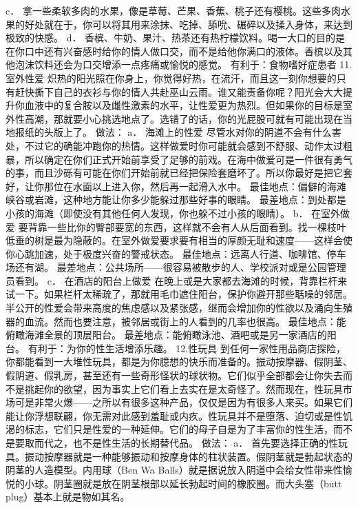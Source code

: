 \documentclass[12pt,UTF8,openany]{ctexbook}
\begin{document}
c． 拿一些柔软多肉的水果，像是草莓、芒果、香蕉、桃子还有樱桃。这些多肉水果的好处就在于，你可以将其用来涂抹、吃掉、舔吮、碾碎以及揉入身体，来达到极致的快感。
d． 香槟、牛奶、果汁、热茶还有热柠檬饮料。喝一大口的目的是在你口中还有兴奋感时给你的情人做口交，而不是给他你满口的液体。香槟以及其他泡沫饮料还会为口交增添一点疼痛或愉悦的感觉。
有利于：食物嗜好症患者
11.室外性爱
炽热的阳光照在你身上，你觉得好热，在流汗，而且这一刻你想要的只有赶快撕下自己的衣衫与你的情人共赴巫山云雨。谁又能责备你呢？阳光会大大提升你血液中的复合胺以及雌性激素的水平，让性爱更为热烈。但如果你的目标是室外性高潮，那就要小心挑选地点了。选错了的话，你的光屁股可就有可能出现在当地报纸的头版上了。
做法：
a． 海滩上的性爱
尽管水对你的阴道不会有什么害处，不过它的确能冲跑你的热情。这样做爱时你可能就会感到不舒服、动作太过粗暴，所以确定在你们正式开始前享受了足够的前戏。在海中做爱可是一件很有勇气的事，而且沙砾有可能在你们开始前就已经把保险套磨坏了。所以你最好是把它套好，让你那位在水面以上进入你，然后再一起滑入水中。
最佳地点：偏僻的海滩峡谷或岩滩，这种地方能让你多少能躲过那些好事的眼睛。
最差地点：到处都是小孩的海滩（即使没有其他任何人发现，你也躲不过小孩的眼睛）。
b． 在室外做爱
要背靠一些比你的臀部要宽的东西，这样就不会有人从后面看到。找一棵枝叶低垂的树是最为隐蔽的。在室外做爱要求要有相当的厚颜无耻和速度——这样会使你心跳加速，处于极度兴奋的警戒状态。
最佳地点：远离人行道、咖啡馆、停车场还有湖。
最差地点：公共场所——很容易被散步的人、学校派对或是公园管理员看到。
c． 在酒店的阳台上做爱
在晚上或是大家都去海滩的时候，背靠栏杆来试一下。如果栏杆太稀疏了，那就用毛巾遮住阳台，保护你避开那些聒噪的邻居。半公开的性爱会带来高度的焦虑感以及紧张感，继而会增加你的性欲以及涌向生殖器的血流。然而也要注意，被邻居或街上的人看到的几率也很高。
最佳地点：能俯瞰海滩全景的顶层阳台。
最差地点：能俯瞰泳池、酒吧或是另一家酒店的阳台。
有利于：为你的性生活增添乐趣。
12.性玩具
到任何一家性用品商店探险，你都能看到一大堆性玩具，都是为你臆想的快乐而准备的。振动按摩器、假阴茎、假阴道、假乳房，甚至还有一些奇形怪状的球状物。它们似乎全部都会让你失去而不是挑起你的欲望，因为事实上它们看上去实在是太奇怪了。然而现在，性玩具市场可是非常火爆——之所以有很多这种产品，仅仅是因为有很多人来买。如果它们能让你浮想联翩，你无需对此感到羞耻或内疚。性玩具并不是堕落、迫切或是性饥渴的标志，它们只是性爱的一种延伸。它们的母子自是为了丰富你的性生活，而不是要取而代之，也不是性生活的长期替代品。
做法：
a． 首先要选择正确的性玩具。振动按摩器就是一种能够振动和按摩身体的柱状装置。假阴茎就是勃起状态的阴茎的人造模型。内用球（Ben Wa Balls）就是据说放入阴道中会给女性带来性愉悦的小球。阴茎圈就是放在阴茎根部以延长勃起时间的橡胶圈。而大头塞（butt plug）基本上就是物如其名。
\end{document}
